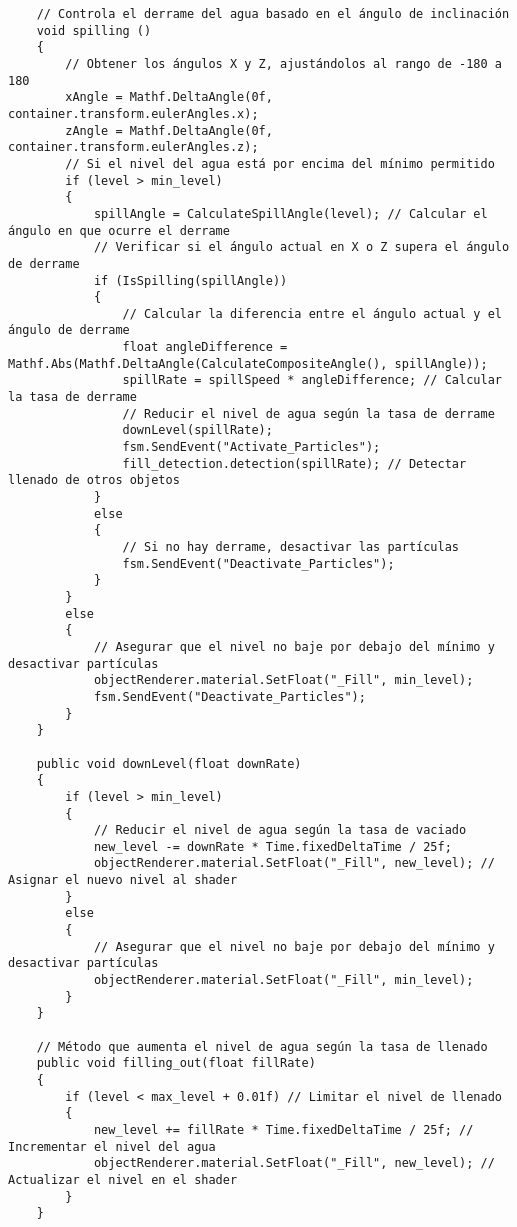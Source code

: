\begin{verbatim}
    // Controla el derrame del agua basado en el ángulo de inclinación
    void spilling ()
    {
        // Obtener los ángulos X y Z, ajustándolos al rango de -180 a 180
        xAngle = Mathf.DeltaAngle(0f, container.transform.eulerAngles.x); 
        zAngle = Mathf.DeltaAngle(0f, container.transform.eulerAngles.z);
        // Si el nivel del agua está por encima del mínimo permitido
        if (level > min_level)
        {
            spillAngle = CalculateSpillAngle(level); // Calcular el ángulo en que ocurre el derrame
            // Verificar si el ángulo actual en X o Z supera el ángulo de derrame
            if (IsSpilling(spillAngle))
            {
                // Calcular la diferencia entre el ángulo actual y el ángulo de derrame
                float angleDifference = Mathf.Abs(Mathf.DeltaAngle(CalculateCompositeAngle(), spillAngle));
                spillRate = spillSpeed * angleDifference; // Calcular la tasa de derrame
                // Reducir el nivel de agua según la tasa de derrame
                downLevel(spillRate);
                fsm.SendEvent("Activate_Particles");
                fill_detection.detection(spillRate); // Detectar llenado de otros objetos
            }
            else
            {
                // Si no hay derrame, desactivar las partículas
                fsm.SendEvent("Deactivate_Particles");
            }
        }
        else
        {
            // Asegurar que el nivel no baje por debajo del mínimo y desactivar partículas
            objectRenderer.material.SetFloat("_Fill", min_level);
            fsm.SendEvent("Deactivate_Particles");
        }
    }

    public void downLevel(float downRate)
    {
        if (level > min_level)
        {
            // Reducir el nivel de agua según la tasa de vaciado
            new_level -= downRate * Time.fixedDeltaTime / 25f;
            objectRenderer.material.SetFloat("_Fill", new_level); // Asignar el nuevo nivel al shader
        }
        else
        {
            // Asegurar que el nivel no baje por debajo del mínimo y desactivar partículas
            objectRenderer.material.SetFloat("_Fill", min_level);
        }
    }

    // Método que aumenta el nivel de agua según la tasa de llenado
    public void filling_out(float fillRate)
    {
        if (level < max_level + 0.01f) // Limitar el nivel de llenado
        {
            new_level += fillRate * Time.fixedDeltaTime / 25f; // Incrementar el nivel del agua
            objectRenderer.material.SetFloat("_Fill", new_level); // Actualizar el nivel en el shader
        }
    }


\end{verbatim}
